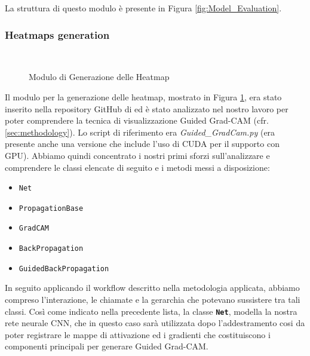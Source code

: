 La struttura di questo modulo è presente in Figura \ref{fig:Model_Evaluation}.

\subsubsection{Heatmaps generation}~ \newline
\begin{figure}[hbpt!]
		\centering
		
  		\caption{Modulo di Generazione delle Heatmap}
        \label{fig:Heatmaps_Generation}
\end{figure}
Il modulo per la generazione delle heatmap, mostrato in Figura \ref{fig:Heatmaps_Generation}, era stato inserito 
nella repository GitHub di \cite{lyu2018deep} ed è stato analizzato nel nostro lavoro per poter comprendere la 
tecnica di visualizzazione Guided Grad-CAM 
(cfr. \ref{sec:methodology}).
Lo script di riferimento era \textit{Guided\_GradCam.py} (era presente anche una versione che include l'uso di CUDA 
per il supporto con GPU). 
Abbiamo quindi concentrato i nostri primi sforzi sull'analizzare e comprendere le classi elencate di seguito e 
i metodi messi a disposizione:
\begin{itemize}
    \item \texttt{Net} 
    \item \texttt{PropagationBase}
    \item \texttt{GradCAM}
    \item \texttt{BackPropagation}
    \item \texttt{GuidedBackPropagation}
\end{itemize}
In seguito applicando il workflow descritto nella metodologia applicata, abbiamo compreso l'interazione, le chiamate 
e la gerarchia che potevano sussistere tra tali classi. Così come indicato nella precedente lista, 
la classe \textbf{\texttt{Net}}, modella la nostra rete neurale CNN, che in questo caso sarà utilizzata dopo
l'addestramento cosi da poter registrare le mappe di attivazione ed i gradienti che costituiscono i componenti
principali per generare Guided Grad-CAM. 

